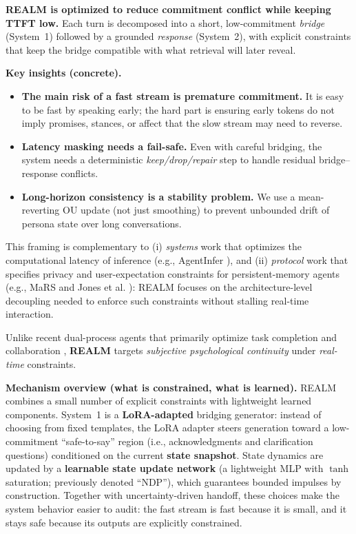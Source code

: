 \documentclass{article}
\begin{document}
\textbf{REALM is optimized to reduce commitment conflict while keeping TTFT low.}
Each turn is decomposed into a short, low-commitment \emph{bridge} (System~1) followed by a grounded \emph{response} (System~2), with explicit constraints that keep the bridge compatible with what retrieval will later reveal.

\noindent\textbf{Key insights (concrete).}
\begin{itemize}
  \item \textbf{The main risk of a fast stream is premature commitment.} It is easy to be fast by speaking early; the hard part is ensuring early tokens do not imply promises, stances, or affect that the slow stream may need to reverse.
  \item \textbf{Latency masking needs a fail-safe.} Even with careful bridging, the system needs a deterministic \emph{keep/drop/repair} step to handle residual bridge--response conflicts.
  \item \textbf{Long-horizon consistency is a stability problem.} We use a mean-reverting OU update (not just smoothing) to prevent unbounded drift of persona state over long conversations.
\end{itemize}

This framing is complementary to (i) \emph{systems} work that optimizes the computational latency of inference (e.g., AgentInfer \cite{lin2025agentinfer}), and (ii) \emph{protocol} work that specifies privacy and user-expectation constraints for persistent-memory agents (e.g., MaRS \cite{alqithami2025mars} and Jones et al. \cite{jones2024userexpectations}): REALM focuses on the architecture-level decoupling needed to enforce such constraints without stalling real-time interaction.

Unlike recent dual-process agents that primarily optimize task completion and collaboration \cite{zhang2025dptagent,liu2023hierarchicalagent}, \textbf{REALM} targets \emph{subjective psychological continuity} under \emph{real-time} constraints.

\textbf{Mechanism overview (what is constrained, what is learned).}
REALM combines a small number of explicit constraints with lightweight learned components.
System~1 is a \textbf{LoRA-adapted} bridging generator: instead of choosing from fixed templates, the LoRA adapter steers generation toward a low-commitment ``safe-to-say'' region (i.e., acknowledgments and clarification questions) conditioned on the current \textbf{state snapshot}.
State dynamics are updated by a \textbf{learnable state update network} (a lightweight MLP with $\tanh$ saturation; previously denoted ``NDP''), which guarantees bounded impulses by construction.
Together with uncertainty-driven handoff, these choices make the system behavior easier to audit: the fast stream is fast because it is small, and it stays safe because its outputs are explicitly constrained.
\end{document}
